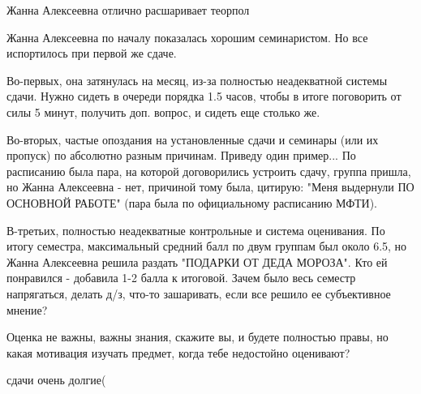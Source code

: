             \begin{commentbox} 
                Жанна Алексеевна отлично расшаривает теорпол 
            \end{commentbox} 
        
            \begin{commentbox} 
                Жанна Алексеевна по началу показалась хорошим семинаристом. Но все испортилось при первой же сдаче. 
        
                Во-первых, она затянулась на месяц, из-за полностью неадекватной системы сдачи. Нужно сидеть в очереди порядка 1.5 часов, чтобы в итоге поговорить от силы 5 минут, получить доп. вопрос, и сидеть еще столько же.
                
                Во-вторых, частые опоздания на установленные сдачи и семинары (или их пропуск) по абсолютно разным причинам. Приведу один пример... По расписанию была пара, на которой договорились устроить сдачу, группа пришла, но Жанна Алексеевна - нет, причиной тому была, цитирую: "Меня выдернули ПО ОСНОВНОЙ РАБОТЕ" (пара была по официальному расписанию МФТИ).
                
                В-третьих, полностью неадекватные контрольные и система оценивания. По итогу семестра, максимальный средний балл по двум группам был около 6.5, но Жанна Алексеевна решила раздать "ПОДАРКИ ОТ ДЕДА МОРОЗА". Кто ей понравился - добавила 1-2 балла к итоговой. Зачем было весь семестр напрягаться, делать д/з, что-то зашаривать, если все решило ее субъективное мнение? 
                
                Оценка не важны, важны знания, скажите вы, и будете полностью правы, но какая мотивация изучать предмет, когда тебе недостойно оценивают? 
            \end{commentbox} 
        
            \begin{commentbox} 
                сдачи очень долгие( 
            \end{commentbox} 
        

